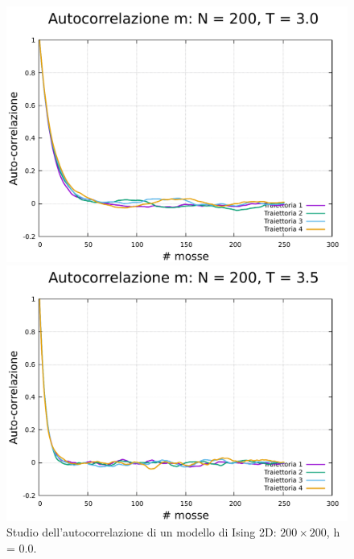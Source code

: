 \begin{figure}[H]
    \begin{minipage}{0.45\textwidth}  
        \centering
        \includegraphics[page=1, width=\textwidth]{Immagini/simIsing2D/metro/tcorr/auto_200_3.0.pdf}
        \caption{$T\,=\,3.0$}
      \end{minipage}\hfill
      \begin{minipage}{0.45\textwidth}  
        \centering
        \includegraphics[page=1, width=\textwidth]{Immagini/simIsing2D/metro/tcorr/auto_200_3.5.pdf}
        \caption{$T\,=\,3.5$}
    \end{minipage}

    \caption{Studio dell'autocorrelazione di un modello di Ising 2D: $200 \times 200$, h = 0.0.}
\end{figure}

